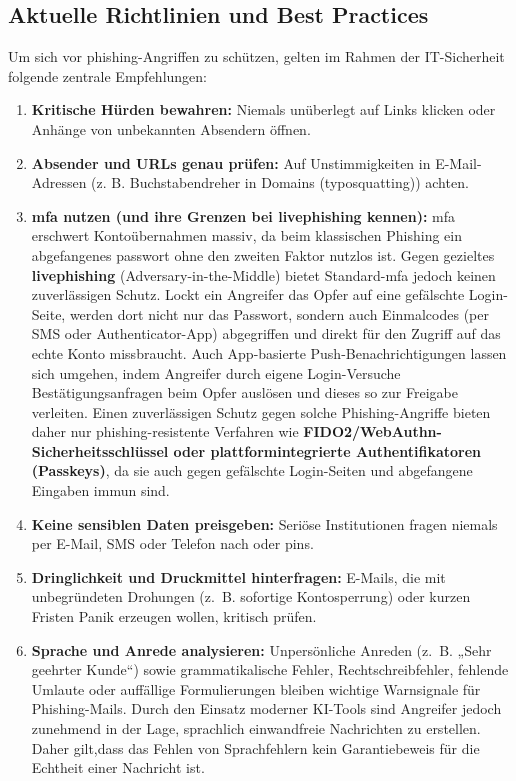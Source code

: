 \documentclass[12pt,a4paper]{article}
\begin{document}
\subsection{Aktuelle Richtlinien und Best Practices}
Um sich vor \gls{phishing}-Angriffen zu schützen, gelten im Rahmen der IT-Sicherheit folgende zentrale Empfehlungen:

\begin{enumerate}
    \item \textbf{Kritische Hürden bewahren:} Niemals unüberlegt auf Links klicken oder \mbox{Anhänge} von unbekannten Absendern öffnen. \cite{cisaphishingpostcard}\cite{bacsphishing}
    \item \textbf{Absender und URLs genau prüfen:} Auf Unstimmigkeiten in E-Mail-Adressen (z. B. Buchstabendreher in Domains (\gls{typosquatting})) achten. \cite{cisaphishingpostcard}\cite{bacsphishing}
    \item \textbf{\gls{mfa} nutzen (und ihre Grenzen bei \gls{livephishing} kennen):} \gls{mfa} erschwert Kontoübernahmen massiv, da beim klassischen Phishing ein abgefangenes \gls{passwort} ohne den zweiten Faktor nutzlos ist. Gegen gezieltes \textbf{\gls{livephishing}} (Adversary-in-the-Middle) bietet Standard-\gls{mfa} jedoch keinen zuverlässigen Schutz. Lockt ein Angreifer das Opfer auf eine gefälschte Login-Seite, werden dort nicht nur das Passwort, sondern auch Einmalcodes (per SMS oder Authenticator-App) abgegriffen und direkt für den Zugriff auf das echte Konto missbraucht. Auch App-basierte Push-Benachrichtigungen lassen sich umgehen, indem Angreifer durch eigene Login-Versuche Bestätigungsanfragen beim Opfer auslösen und dieses so zur Freigabe verleiten. Einen zuverlässigen Schutz gegen solche Phishing-Angriffe bieten daher nur phishing-resistente Verfahren wie \textbf{FIDO2/WebAuthn-Sicherheitsschlüssel oder plattformintegrierte Authentifikatoren (Passkeys)}, da sie auch gegen gefälschte Login-Seiten und abgefangene Eingaben immun sind. \cite{cisaphishingpostcard} \cite{cisamfa}
    \item \textbf{Keine sensiblen Daten preisgeben:} Seriöse Institutionen fragen niemals per E-Mail, SMS oder Telefon nach  oder \gls{pin}s. \cite{bacsphishing}
    \item \textbf{Dringlichkeit und Druckmittel hinterfragen:} E-Mails, die mit \mbox{unbegründeten} Drohungen (z.~B. sofortige Kontosperrung) oder kurzen Fristen Panik erzeugen \mbox{wollen}, kritisch prüfen. \cite{cisaphishingpostcard}
    \item \textbf{Sprache und Anrede analysieren:} Unpersönliche Anreden (z.~B. „Sehr \mbox{geehrter} Kunde“) sowie grammatikalische Fehler, Rechtschreibfehler, fehlende Umlaute oder auffällige Formulierungen bleiben wichtige Warnsignale für Phishing-Mails. Durch den Einsatz moderner KI-Tools sind Angreifer jedoch zunehmend in der Lage, sprachlich einwandfreie Nachrichten zu erstellen. Daher gilt,dass das Fehlen von Sprachfehlern kein Garantiebeweis für die Echtheit einer Nachricht ist. \cite{cisaphishingpostcard}

\end{enumerate}
\end{document}
